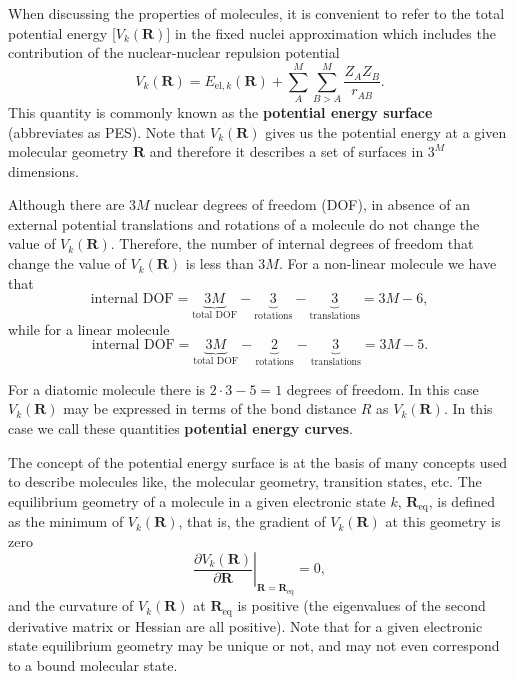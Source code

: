 \documentclass[../Main/chem532-notes.tex]{subfiles}
\begin{document}
When discussing the properties of molecules, it is convenient to refer to the total potential energy [$V_{k}(\mathbf{R})$] in the fixed nuclei approximation which includes the contribution of the nuclear-nuclear repulsion potential
\begin{equation}
V_{k}(\mathbf{R}) = E_{\mathrm{el},k}(\mathbf{R}) + \sum_{A}^{M} \sum_{B > A}^{M} \frac{Z_A Z_B}{r_{AB}}.
\end{equation}
This quantity is commonly known as the \textbf{potential energy surface} (abbreviates as PES).
Note that $V_{k}(\mathbf{R})$ gives us the potential energy at a given molecular geometry $\mathbf{R}$ and therefore it describes a set of surfaces in $3^M$ dimensions.

\begin{example}
\end{example}

Although there are $3M$ nuclear degrees of freedom (DOF), in absence of an external potential translations and rotations of a molecule do not change the value of $V_{k}(\mathbf{R})$. Therefore, the number of internal degrees of freedom that change the value of $V_{k}(\mathbf{R})$ is less than $3M$. For a non-linear molecule we have that
\begin{equation}
\text{internal DOF} = \underbrace{3 M}_{\text{total DOF}}
-\underbrace{3}_{\text{rotations}}
-\underbrace{3}_{\text{translations}} = 3M - 6,
\end{equation}
while for a linear molecule
\begin{equation}
\text{internal DOF} = \underbrace{3 M}_{\text{total DOF}}
-\underbrace{2}_{\text{rotations}}
-\underbrace{3}_{\text{translations}} =  3M - 5.
\end{equation}

\begin{example}
For a diatomic molecule there is $2\cdot3 - 5 = 1$ degrees of freedom. In this case $V_{k}(\mathbf{R})$ may be expressed in terms of the bond distance $R$ as $V_{k}(\mathbf{R})$. In this case we call these quantities \textbf{potential energy curves}.
\end{example}

The concept of the potential energy surface is at the basis of many concepts used to describe molecules like, the molecular geometry, transition states, etc.
The equilibrium geometry of a molecule in a given electronic state $k$, $\mathbf{R}_\mathrm{eq}$, is defined as the minimum of $V_{k}(\mathbf{R})$, that is, the gradient of $V_{k}(\mathbf{R})$ at this geometry is zero
\begin{equation}
\left. \frac{\partial V_{k}(\mathbf{R})}{\partial \mathbf{R}} \right|_{\mathbf{R}= \mathbf{R}_\mathrm{eq}}= 0,
\end{equation}
and the curvature of $V_{k}(\mathbf{R})$ at $\mathbf{R}_\mathrm{eq}$ is positive (the eigenvalues of the second derivative matrix or Hessian are all positive).
Note that for a given electronic state equilibrium geometry may be unique or not, and may not even correspond to a bound molecular state.
\end{document}
